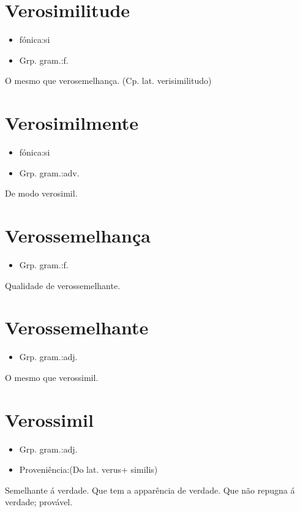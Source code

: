 \documentclass{article}
\begin{document}
\section{Verosimilitude}
\begin{itemize}
\item {fónica:si}
\end{itemize}
\begin{itemize}
\item {Grp. gram.:f.}
\end{itemize}
O mesmo que \textunderscore verosemelhança\textunderscore .
(Cp. lat. \textunderscore verisimilitudo\textunderscore )
\section{Verosimilmente}
\begin{itemize}
\item {fónica:si}
\end{itemize}
\begin{itemize}
\item {Grp. gram.:adv.}
\end{itemize}
De modo verosimil.
\section{Verossemelhança}
\begin{itemize}
\item {Grp. gram.:f.}
\end{itemize}
Qualidade de verossemelhante.
\section{Verossemelhante}
\begin{itemize}
\item {Grp. gram.:adj.}
\end{itemize}
O mesmo que \textunderscore verossimil\textunderscore .
\section{Verossimil}
\begin{itemize}
\item {Grp. gram.:adj.}
\end{itemize}
\begin{itemize}
\item {Proveniência:(Do lat. \textunderscore verus\textunderscore  + \textunderscore similis\textunderscore )}
\end{itemize}
Semelhante á verdade.
Que tem a apparência de verdade.
Que não repugna á verdade; provável.
\end{document}
